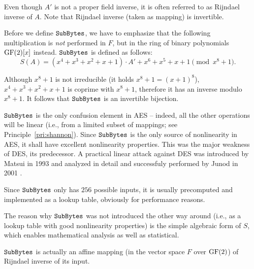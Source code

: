 	\begin{note}
	\label{note:rijinv}
		Even though $A'$ is not a proper field inverse, it is often referred to as {Rijndael inverse} of $A$. Note that Rijndael inverse (taken as mapping) is invertible.
	\end{note}
	
	Before we define $\texttt{SubBytes}$, we have to emphasize that the following multiplication is {\em not} performed in $F$, but in the ring of binary polynomials $\mathrm{GF}(2)[x]$ instead. $\texttt{SubBytes}$ is defined as follows:
	\newcommand{\defsbox}{S(A) = (x^4 + x^3 + x^2 + x + 1) \cdot A' + x^6 + x^5 + x + 1 \pmod{x^8+1}}
	\begin{equation}
	\label{eq:sbox}
		\defsbox .
	\end{equation}
	
	\begin{note}
	\label{note:sboxinv}
		Although $x^8+1$ is not irreducible (it holds $x^8+1 = (x+1)^8$), $x^4 + x^3 + x^2 + x + 1$ is coprime with $x^8+1$, therefore it has an inverse modulo $x^8+1$. It follows that $\texttt{SubBytes}$ is an invertible bijection.
	\end{note}
	
	$\texttt{SubBytes}$ is the only confusion element in AES -- indeed, all the other operations will be linear (i.e., from a limited subset of mappings; see Principle~\ref{pri:shannon}). Since $\texttt{SubBytes}$ is the only source of nonlinearity in AES, it shall have excellent nonlinearity properties. This was the major weakness of DES, its predecessor. A practical linear attack against DES was introduced by Matsui \cite{matsui1993linear} in 1993 and analyzed in detail and successfuly performed by Junod in 2001 \cite{junod2001complexity}.
	
	\begin{remark}
	\label{rem:sboxtable}
		Since $\texttt{SubBytes}$ only has $256$ possible inputs, it is usually precomputed and implemented as a lookup table, obviously for performance reasons.
	\end{remark}
	
	The reason why $\texttt{SubBytes}$ was not introduced the other way around (i.e., as a lookup table with good nonlinearity properties) is the simple algebraic form of $S$, which enables mathematical analysis as well as statistical.
	
	\begin{remark}
	\label{rem:sboxaff}
		$\texttt{SubBytes}$ is actually an affine mapping (in the vector space $F$ over $\mathrm{GF}(2)$) of Rijndael inverse of its input.
	\end{remark}

